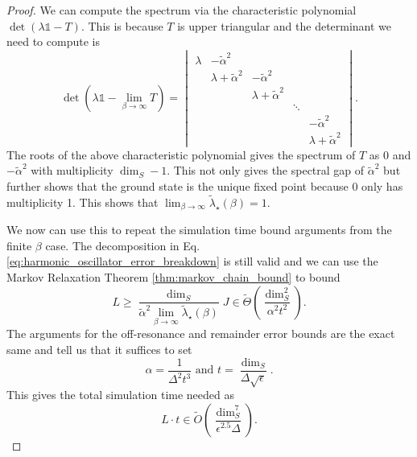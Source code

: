 \documentclass[
 amsmath,amssymb,
 aps,
onecolumn, 
nofootinbib]{revtex4-2}
\newcommand{\bigotilde}[1]{\widetilde{O} \left( #1 \right)}
\newcommand{\identity}{\mathds{1}}
\begin{document}
\begin{proof}
We can compute the spectrum via the characteristic polynomial $\det(\lambda \identity - T)$. This is because $T$ is upper triangular and the determinant we need to compute is
\begin{equation}
    \det \left(\lambda \identity - \lim_{\beta \to \infty} T \right) =  \begin{vmatrix}
        \lambda & -\widetilde{\alpha}^2 &   &\\
        & \lambda + \widetilde{\alpha}^2 & -\widetilde{\alpha}^2 &  &\\
        & & \lambda + \widetilde{\alpha}^2  & & \\
        & & & \ddots & \\
        & &     &       & -\widetilde{\alpha}^2 \\
        & &  & & \lambda + \widetilde{\alpha}^2
    \end{vmatrix}.
\end{equation}
    The roots of the above characteristic polynomial gives the spectrum of $T$ as 0 and $-\widetilde{\alpha}^2$ with multiplicity $\dim_S - 1$. This not only gives the spectral gap of $\widetilde{\alpha}^2$ but further shows that the ground state is the unique fixed point because 0 only has multiplicity 1. This shows that $\lim_{\beta \to \infty} \widetilde{\lambda}_\star(\beta) = 1$.

    We now can use this to repeat the simulation time bound arguments from the finite $\beta$ case. The decomposition in Eq. \eqref{eq:harmonic_oscillator_error_breakdown} is still valid and we can use the Markov Relaxation Theorem \ref{thm:markov_chain_bound} to bound
    \begin{equation}
        L \ge \frac{\dim_S}{\widetilde{\alpha}^2\lim_{\beta \to \infty} \widetilde{\lambda}_\star(\beta)} J \in \widetilde{\Theta}\left({\frac{\dim_S^2}{\alpha^2 t^2}}\right).
    \end{equation}
    The arguments for the off-resonance and remainder error bounds are the exact same and tell us that it suffices to set
    \begin{equation}
        \alpha = \frac{1}{\Delta^2 t^3} \text{ and } t = \frac{\dim_S}{\Delta \sqrt{\epsilon}}.
    \end{equation}
    This gives the total simulation time needed as
    \begin{equation}
        L\cdot t \in \bigotilde{\frac{\dim_S^7}{\epsilon^{2.5} \Delta}}.
    \end{equation}
\end{proof}
\end{document}
